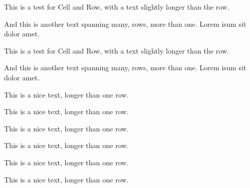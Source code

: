 \documentclass{scrartcl}
\begin{document}
%

\begin{Row}%
\begin{Cell}{2}
This is a test for Cell and Row, with a text slightly longer than the row.
\end{Cell}
\begin{Cell}{1}
And this is another text spanning many, rows, more than one. Lorem isum sit dolor amet.
\end{Cell}
\end{Row}

\bigskip

\begin{Row}%
\begin{Cell}{2}
This is a test for Cell and Row, with a text slightly longer than the row.
\end{Cell}%
\begin{Cell}{1}
And this is another text spanning many, rows, more than one. Lorem isum sit dolor amet.
\end{Cell}%
\end{Row}

\bigskip

\begin{row}[cellsep=0.5cm]{3}{3}%
\begin{cell}{1}
This is a nice text, longer than one row.
\end{cell}
\begin{cell}{1}
This is a nice text, longer than one row.
\end{cell}
\begin{cell}{1}
This is a nice text, longer than one row.
\end{cell}
\end{row}

\begin{row}[cellsep=0.5cm]{3}{3}%
\begin{cell}{1}
This is a nice text, longer than one row.
\end{cell}
\begin{cell}{1}
This is a nice text, longer than one row.
\end{cell}
\begin{cell}{1}
This is a nice text, longer than one row.
\end{cell}
\end{row}

\bigskip

\begin{row}[cellsep=0.5cm]{3}{2}
	\begin{cell}{2}
	\end{cell}
	\begin{cell}{1}
	\end{cell}
\end{row}
\end{document}
